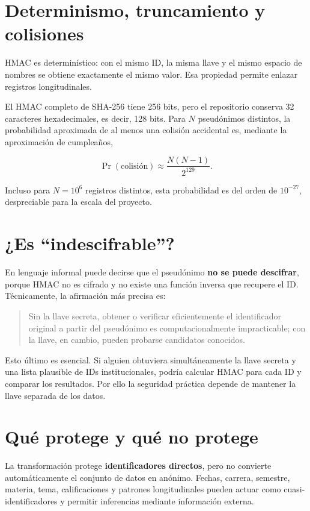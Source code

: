 \documentclass[11pt,a4paper]{article}
\begin{document}
\section{Determinismo, truncamiento y colisiones}

HMAC es determinístico: con el mismo ID, la misma llave y el mismo espacio de nombres se obtiene exactamente el mismo valor. Esa propiedad permite enlazar registros longitudinales.

El HMAC completo de SHA-256 tiene 256 bits, pero el repositorio conserva 32 caracteres hexadecimales, es decir, 128 bits. Para $N$ pseudónimos distintos, la probabilidad aproximada de al menos una colisión accidental es, mediante la aproximación de cumpleaños,

\[
\Pr(\text{colisión})
\approx
\frac{N(N-1)}{2^{129}}.
\]

Incluso para $N=10^6$ registros distintos, esta probabilidad es del orden de $10^{-27}$, despreciable para la escala del proyecto.

\section{¿Es ``indescifrable''?}

En lenguaje informal puede decirse que el pseudónimo \textbf{no se puede descifrar}, porque HMAC no es cifrado y no existe una función inversa que recupere el ID. Técnicamente, la afirmación más precisa es:

\begin{quote}
Sin la llave secreta, obtener o verificar eficientemente el identificador original a partir del pseudónimo es computacionalmente impracticable; con la llave, en cambio, pueden probarse candidatos conocidos.
\end{quote}

Esto último es esencial. Si alguien obtuviera simultáneamente la llave secreta y una lista plausible de IDs institucionales, podría calcular HMAC para cada ID y comparar los resultados. Por ello la seguridad práctica depende de mantener la llave separada de los datos.

\section{Qué protege y qué no protege}

La transformación protege \textbf{identificadores directos}, pero no convierte automáticamente el conjunto de datos en anónimo. Fechas, carrera, semestre, materia, tema, calificaciones y patrones longitudinales pueden actuar como cuasi-identificadores y permitir inferencias mediante información externa.
\end{document}

